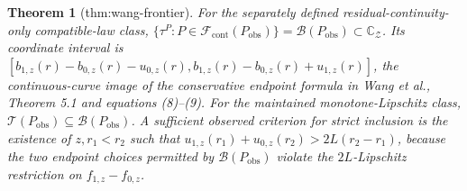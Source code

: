 \documentclass{article}
\newtheorem{theorem}{Theorem}
\begin{document}
\begin{theorem}[thm:wang-frontier]\label{thm:wang-frontier}
For the separately defined residual-continuity-only compatible-law class, \(\{\tau^P:P\in\mathcal F_{\mathrm{cont}}(P_{\mathrm{obs}})\}=\mathcal B(P_{\mathrm{obs}})\subset\mathbb C_{\mathcal Z}\). Its coordinate interval is \([b_{1,z}(r)-b_{0,z}(r)-u_{0,z}(r),b_{1,z}(r)-b_{0,z}(r)+u_{1,z}(r)]\), the continuous-curve image of the conservative endpoint formula in Wang et al., Theorem 5.1 and equations (8)--(9). For the maintained monotone-Lipschitz class, \(\mathcal T(P_{\mathrm{obs}})\subseteq\mathcal B(P_{\mathrm{obs}})\). A sufficient observed criterion for strict inclusion is the existence of \(z,r_1<r_2\) such that \(u_{1,z}(r_1)+u_{0,z}(r_2)>2L(r_2-r_1)\), because the two endpoint choices permitted by \(\mathcal B(P_{\mathrm{obs}})\) violate the \(2L\)-Lipschitz restriction on \(f_{1,z}-f_{0,z}\).
\end{theorem}
\end{document}
